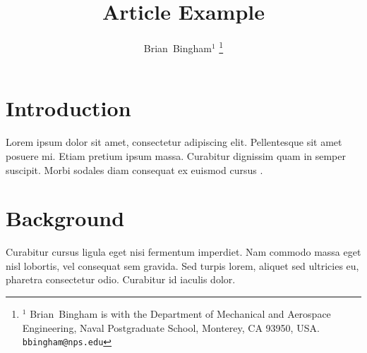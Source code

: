 \documentclass[11pt,draftcls,journal,onecolumn]{../latexlib/latex_ieee/IEEEtran}
\begin{document}
\newtheorem{remark}{Remark}
\renewcommand{\theremark}{\unskip}



\newcommand{\SF}{0.2}
\newcommand{\SFb}{0.45}
\newcommand{\SFPic}{0.45}
\newcommand{\SFPlot}{0.45}
\newcommand{\SFc}{0.25}
\newcommand{\FigWidth}{\SFb}

\newcommand{\scaleOneTwo}[2] {\scalebox{#1}}

\graphicspath{{images/}}


\title{Article Example}

\author{Brian~Bingham$^{1}$%
\thanks{$^{1}$ Brian~Bingham is with the Department of Mechanical and Aerospace Engineering, Naval Postgraduate School, Monterey, CA 93950, USA. {\tt\small bbingham@nps.edu}}%
}

\maketitle


\IEEEpeerreviewmaketitle

\section{Introduction}
Lorem ipsum dolor sit amet, consectetur adipiscing elit. Pellentesque sit amet posuere mi. Etiam pretium ipsum massa. Curabitur dignissim quam in semper suscipit. Morbi sodales diam consequat ex euismod cursus \cite{bingham03phd}.

\section{Background}
 Curabitur cursus ligula eget nisi fermentum imperdiet. Nam commodo massa eget nisl lobortis, vel consequat sem gravida. Sed turpis lorem, aliquet sed ultricies eu, pharetra consectetur odio. Curabitur id iaculis dolor. 
\end{document}
